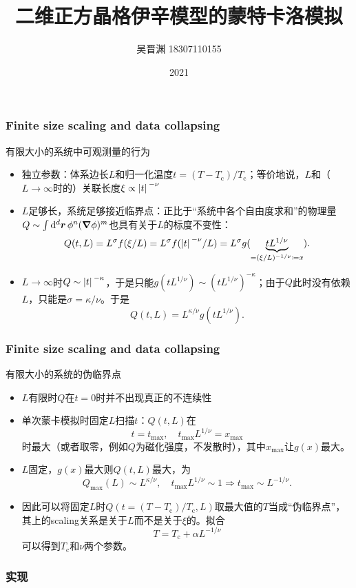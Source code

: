 \documentclass[UTF8]{ctexbeamer}
\title{二维正方晶格伊辛模型的蒙特卡洛模拟}
\author{吴晋渊 18307110155}
\institute{复旦大学物理学系}
\date{2021}
\begin{document}
\frame{\titlepage}

\begin{frame}
\frametitle{Finite size scaling and data collapsing}

有限大小的系统中可观测量的行为

\begin{itemize}
    \item 独立参数：体系边长$L$和归一化温度$t = (T - T_\text{c}) / T_\text{c}$；等价地说，$L$和（$L \to \infty$时的）关联长度$\xi \propto \abs*{t}^{- \nu}$
    \item $L$足够长，系统足够接近临界点：正比于“系统中各个自由度求和”的物理量$Q \sim \int \dd[d]{\vb*{r}} \phi^n (\grad{\phi})^m$也具有关于$L$的标度不变性：
    \[
        Q(t, L) = L^\sigma f(\xi / L) = L^{\sigma} f(\abs*{t}^{- \nu} / L) = L^\sigma g(\underbrace{t L^{1 / \nu}}_{= (\xi / L)^{- 1 / \nu} \coloneqq x}).
    \]
    \item $L \to \infty$时$Q \sim \abs*{t}^{- \kappa}$，于是只能$g(t L^{1 / \nu}) \sim (t L^{1 / \nu})^{- \kappa}$；由于$Q$此时没有依赖$L$，只能是$\sigma = \kappa / \nu$。于是
    \begin{equation}
        Q(t, L) = L^{\kappa / \nu} g(t L^{1 / \nu}).
    \end{equation}
\end{itemize}    

\end{frame}

\begin{frame}
\frametitle{Finite size scaling and data collapsing}

有限大小的系统的伪临界点

\begin{itemize}
    \item $L$有限时$Q$在$t=0$时并不出现真正的不连续性
    \item 单次蒙卡模拟时固定$L$扫描$t$：$Q(t, L)$在
    \begin{equation}
        t = t_\text{max}, \quad t_\text{max} L^{1 / \nu} = x_\text{max}
    \end{equation}
    时最大（或者取零，例如$Q$为磁化强度，不发散时），其中$x_\text{max}$让$g(x)$最大。
    \item $L$固定，$g(x)$最大则$Q(t, L)$最大，为
    \begin{equation}
        Q_\text{max}(L) \sim L^{\kappa / \nu}, \quad t_\text{max} L^{1 / \nu} \sim 1 \Rightarrow t_\text{max} \sim L^{- 1 / \nu}.
    \end{equation}
    \item 因此可以将固定$L$时$Q(t = (T - T_\text{c}) / T_\text{c}, L)$取最大值的$T$当成“伪临界点”，其上的scaling关系是关于$L$而不是关于$\xi$的。拟合
    \begin{equation}
        T = T_\text{c} + \alpha L^{- 1 / \nu}
    \end{equation}
    可以得到$T_\text{c}$和$\nu$两个参数。
\end{itemize}

\end{frame}

\begin{frame}
\frametitle{实现}

    

\end{frame}
\end{document}
